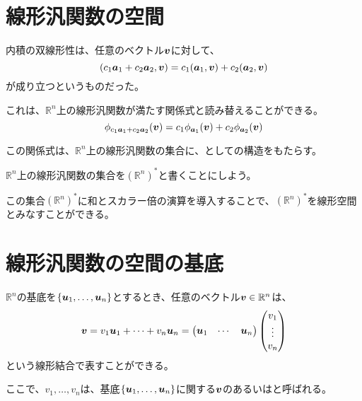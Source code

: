 \documentclass[../../../topic_linear-algebra]{subfiles}
\begin{document}
\sectionline
\section{線形汎関数の空間}

内積の双線形性は、任意のベクトル$\vb*{v}$に対して、
\begin{equation*}
  (c_1 \vb*{a}_1 + c_2 \vb*{a}_2, \vb*{v}) = c_1 (\vb*{a}_1, \vb*{v}) + c_2 (\vb*{a}_2, \vb*{v})
\end{equation*}
が成り立つというものだった。

\br

これは、$\mathbb{R}^n$上の線形汎関数が満たす関係式と読み替えることができる。
\begin{equation*}
  \phi_{c_1 \vb*{a}_1 + c_2 \vb*{a}_2}(\vb*{v}) = c_1 \phi_{\vb*{a}_1}(\vb*{v}) + c_2 \phi_{\vb*{a}_2}(\vb*{v})
\end{equation*}

この関係式は、$\mathbb{R}^n$上の線形汎関数の集合に、としての構造をもたらす。

\br

$\mathbb{R}^n$上の線形汎関数の集合を$(\mathbb{R}^n)^*$と書くことにしよう。

この集合$(\mathbb{R}^n)^*$に和とスカラー倍の演算を導入することで、$(\mathbb{R}^n)^*$を線形空間とみなすことができる。

\sectionline
\section{線形汎関数の空間の基底}

$\mathbb{R}^n$の基底を$\{ \vb*{u}_1, \ldots, \vb*{u}_n \}$とするとき、任意のベクトル$\vb*{v} \in \mathbb{R}^n$は、
\begin{equation*}
  \vb*{v} = v_1 \vb*{u}_1 + \cdots + v_n \vb*{u}_n = \begin{pmatrix}
    \vb*{u}_1 & \cdots & \vb*{u}_n
  \end{pmatrix} \begin{pmatrix}
    v_1 \\
    \vdots \\
    v_n
  \end{pmatrix}
\end{equation*}
という線形結合で表すことができる。

ここで、$v_1, \ldots, v_n$は、基底$\{\vb*{u}_1, \ldots, \vb*{u}_n\}$に関する$\vb*{v}$のあるいはと呼ばれる。
\end{document}
